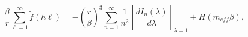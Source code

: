 \begin{equation}
\frac{\beta }{r}\sum _{\ell =1}^{\infty }\widetilde{f}\left(h\ell \right)=-\left(\frac{r}{\beta }\right)^{3}\sum _{n=1}^{\infty }\frac{1}{n^{2}}\left[\frac{dI_{n}\left(\lambda \right)}{d\lambda }\right]_{\lambda =1}+H\left(m_{eff}\beta \right),\label{R Abel-Plana 2}\end{equation}

